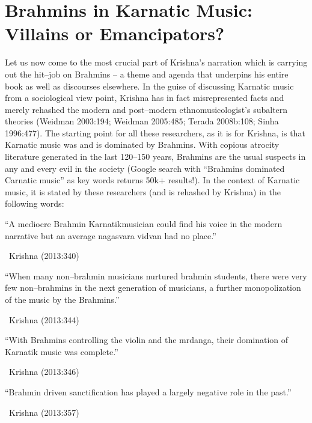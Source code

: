 \vspace{-.2cm}

\vspace{-.1cm}

\section*{Brahmins in Karnatic Music: Villains or Emancipators?}

Let us now come to the most crucial part of Krishna’s narration which is carrying out the hit–job on Brahmins – a theme and agenda that underpins his entire book as well as discourses elsewhere. In the guise of discussing Karnatic music from a sociological view point, Krishna has in fact misrepresented facts and merely rehashed the modern and post–modern ethnomusicologist’s subaltern theories (Weidman 2003:194; Weidman 2005:485; Terada 2008b:108; Sinha 1996:477). The starting point for all these researchers, as it is for Krishna, is that Karnatic music was and is dominated by Brahmins. With copious atrocity literature generated in the last 120–150 years, Brahmins are the usual suspects in any and every evil in the society (Google search with “Brahmins dominated Carnatic music” as key words returns 50k+ results!). In the context of Karnatic music, it is stated by these researchers (and is rehashed by Krishna) in the following words:

\begin{myquote}
“A mediocre Brahmin Karnatikmusician could find his voice in the modern narrative but an average nagasvara vidvan had no place.” 

~\hfill Krishna (2013:340)
\end{myquote}

\begin{myquote}
“When many non–brahmin musicians nurtured brahmin students, there were very few non–brahmins in the next generation of musicians, a further monopolization of the music by the Brahmins.” 

~\hfill Krishna (2013:344)
\end{myquote}

\begin{myquote}
“With Brahmins controlling the violin and the mrdanga, their domination of Karnatik music was complete.” 

~\hfill Krishna (2013:346)
\end{myquote}

\begin{myquote}
“Brahmin driven sanctification has played a largely negative role in the past.” 

~\hfill Krishna (2013:357)
\end{myquote}

